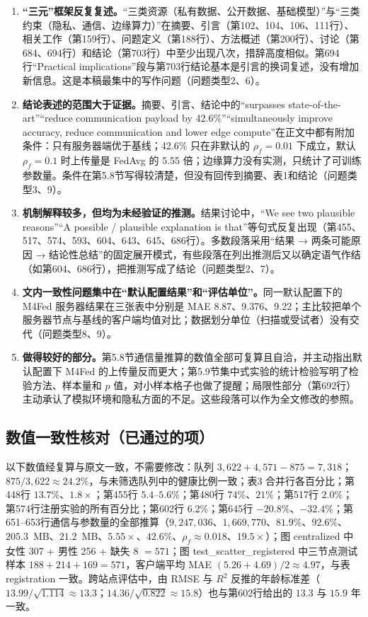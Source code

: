 \documentclass[11pt,a4paper]{ctexart}
\begin{document}
\begin{enumerate}[leftmargin=*]
\item \textbf{“三元”框架反复复述。}“三类资源（私有数据、公开数据、基础模型）”与“三类约束（隐私、通信、边缘算力）”在摘要、引言（第102、104、106、111行）、相关工作（第159行）、问题定义（第188行）、方法概述（第200行）、讨论（第684、694行）和结论（第703行）中至少出现八次，措辞高度相似。第694行“Practical implications”段与第703行结论基本是引言的换词复述，没有增加新信息。这是本稿最集中的写作问题（问题类型2、6）。
\item \textbf{结论表述的范围大于证据。}摘要、引言、结论中的“surpasses state-of-the-art”“reduce communication payload by 42.6\%”“simultaneously improve accuracy, reduce communication and lower edge compute”在正文中都有附加条件：只有服务器端优于基线；42.6\% 只在非默认的 $\rho_f=0.01$ 下成立，默认 $\rho_f=0.1$ 时上传量是 FedAvg 的 5.55 倍；边缘算力没有实测，只统计了可训练参数量。条件在第5.8节写得较清楚，但没有回传到摘要、表1和结论（问题类型3、9）。
\item \textbf{机制解释较多，但均为未经验证的推测。}结果讨论中，“We see two plausible reasons”“A possible / plausible explanation is that”等句式反复出现（第455、517、574、593、604、643、645、686行）。多数段落采用“结果 → 两条可能原因 → 结论性总结”的固定展开模式，有些段落在列出推测后又以确定语气作结（如第604、686行），把推测写成了结论（问题类型2、7）。
\item \textbf{文内一致性问题集中在“默认配置结果”和“评估单位”。}同一默认配置下的 M4Fed 服务器结果在三张表中分别是 MAE 8.87、9.376、9.22；主比较把单个服务器节点与基线的客户端均值对比；数据划分单位（扫描或受试者）没有交代（问题类型8、9）。
\item \textbf{做得较好的部分。}第5.8节通信量推算的数值全部可复算且自洽，并主动指出默认配置下 M4Fed 的上传量反而更大；第5.9节集中式实验的统计检验写明了检验方法、样本量和 $p$ 值，对小样本格子也做了提醒；局限性部分（第692行）主动承认了模拟环境和隐私方面的不足。这些段落可以作为全文修改的参照。
\end{enumerate}

\subsection{数值一致性核对（已通过的项）}
以下数值经复算与原文一致，不需要修改：队列 $3{,}622+4{,}571-875=7{,}318$；$875/3{,}622\approx24.2\%$，与未筛选队列中的健康比例一致；表3 合并行各百分比；第448行 $13.7\%$、$1.8\times$；第455行 $5.4$--$5.6\%$；第480行 $74\%$、$21\%$；第517行 $2.0\%$；第574行注册实验的所有百分比；第602行 $6.2\%$；第645行 $-20.8\%$、$-32.4\%$；第651--653行通信与参数量的全部推算（$9{,}247{,}036$、$1{,}669{,}770$、$81.9\%$、$92.6\%$、$205.3$~MB、$21.2$~MB、$5.55\times$、$42.6\%$、$\rho_f\approx0.018$、$19.5\times$）；图 centralized 中女性 307 + 男性 256 + 缺失 8 $=571$；图 test\_scatter\_registered 中三节点测试样本 $188+214+169=571$，客户端平均 MAE $(5.26+4.69)/2\approx4.97$，与表 registration 一致。跨站点评估中，由 RMSE 与 $R^2$ 反推的年龄标准差（$13.99/\sqrt{1.114}\approx13.3$；$14.36/\sqrt{0.822}\approx15.8$）也与第602行给出的 $13.3$ 与 $15.9$ 年一致。
\end{document}
